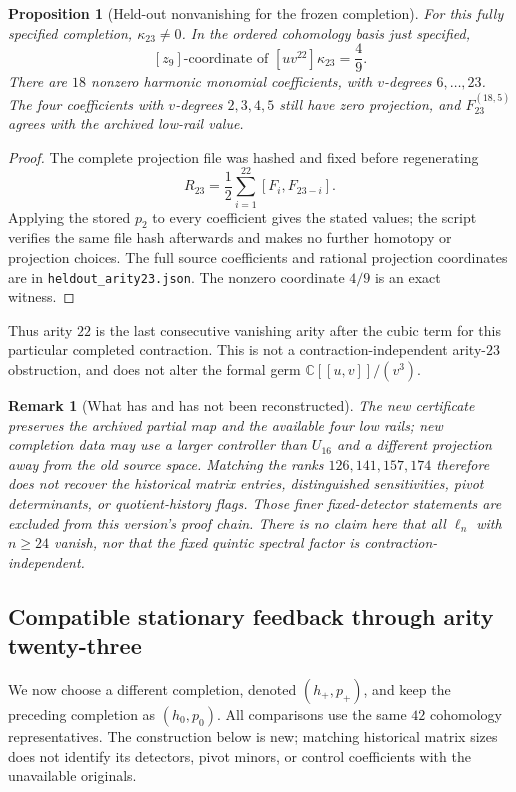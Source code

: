 \documentclass[11pt]{amsart}
\newtheorem{proposition}[theorem]{Proposition}
\newtheorem{remark}[theorem]{Remark}
\newcommand{\C}{\mathbb C}
\begin{document}
\begin{proposition}[Held-out nonvanishing for the frozen completion]
\label{prop:frozen-23}
For this fully specified completion, $\kappa_{23}\ne0$. In the ordered
cohomology basis just specified,
\[
\boxed{[z_9]\text{-coordinate of }[uv^{22}]\kappa_{23}=\frac49.}
\]
There are $18$ nonzero harmonic monomial coefficients, with $v$-degrees
$6,\ldots,23$. The four coefficients with $v$-degrees $2,3,4,5$ still have
zero projection, and $F_{23}^{(18,5)}$ agrees with the archived low-rail value.
\end{proposition}
\begin{proof}
The complete projection file was hashed and fixed before regenerating
\[
R_{23}=\frac12\sum_{i=1}^{22}[F_i,F_{23-i}].
\]
Applying the stored $p_2$
to every coefficient gives the stated values; the script verifies the same
file hash afterwards and makes no further homotopy or projection choices.
The full source coefficients and rational projection coordinates are in
\texttt{heldout\_arity23.json}. The nonzero coordinate $4/9$ is an exact witness.
\end{proof}

Thus arity $22$ is the last consecutive vanishing arity after the cubic term
for this particular completed contraction. This is not a contraction-independent
arity-$23$ obstruction, and does not alter the formal germ $\C[[u,v]]/(v^3)$.

\begin{remark}[What has and has not been reconstructed]\label{rem:new-not-historical}
The new certificate preserves the archived partial map and the available
four low rails; new completion data may use a larger controller than $U_{16}$
and a different projection away from the old source space. Matching the ranks
$126,141,157,174$ therefore does not recover the historical matrix entries,
distinguished sensitivities, pivot determinants, or quotient-history flags.
Those finer fixed-detector statements are excluded from this version's proof
chain. There is no claim here that all $\ell_n$ with $n\ge24$ vanish,
nor that the fixed quintic spectral factor is contraction-independent.
\end{remark}

\subsection{Compatible stationary feedback through arity twenty-three}
\label{subsec:feedback-23}

We now choose a different completion, denoted $(h_+,p_+)$, and keep the preceding
completion as $(h_0,p_0)$. All comparisons use the same $42$ cohomology
representatives. The construction below is new; matching historical matrix
sizes does not identify its detectors, pivot minors, or control coefficients
with the unavailable originals.
\end{document}
